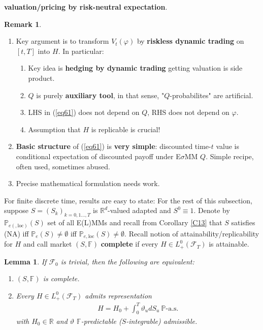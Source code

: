 \documentclass[12pt,a4paper, twoside]{article}
\newtheorem{lem}{Lemma}[section]
\theoremstyle{definition}
\newtheorem{rem}{Remark}[section]
\newcommand{\PP}{\mathbb{P}} %
\begin{document}
\textbf{valuation/pricing by risk-neutral expectation}. 
\newpage
\begin{rem} \
\begin{enumerate}
\item Key argument is to transform $V_t( \varphi)$ by \textbf{riskless dynamic trading} on $[t,T]$ into $H$. In particular:
\begin{enumerate}
\item Key idea is \textbf{hedging by dynamic trading} getting valuation is side product.
\item $Q$ is purely \textbf{auxiliary tool}, in that sense, "$Q$-probabilites" are artificial.
\item LHS in (\ref{eq61}) does not depend on $Q$, RHS does not depend on $\varphi$. 
\item Assumption that $H$ is replicable is crucial!
\end{enumerate}
\item \textbf{Basic structure} of (\ref{eq61}) is \textbf{very simple}: discounted time-$t$ value is conditional expectation of discounted payoff under E$\sigma$MM $Q$. Simple recipe, often used, sometimes abused.
\item Precise mathematical formulation needs work. 
\end{enumerate}
\end{rem}
For finite discrete time, results are easy to state: For the rest of this subsection, suppose $S=(S_k)_{k=0,1 \dots ,T}$ is $\mathbb{R}^d$-valued adapted and $S^0 \equiv 1$. Denote by $\PP_{e(, \text{loc})}(S)$ set of all E(L)MMs and recall from Corollary \ref{C13} that $S$ satisfies (NA) iff $\PP_e(S) \neq \emptyset$ iff $\PP_{e, \text{loc}}(S) \neq \emptyset$. Recall notion of attainability/replicability for $H$ and call market $(S, \mathbb{F})$ \textbf{complete} if every $H \in L_+^0( \mathcal{F}_T)$ is attainable. 
\begin{lem} \label{L61} If $\mathcal{F}_0$ is trivial, then the following are equivalent:
\begin{enumerate}
\item $(S, \mathbb{F})$ is complete.
\item Every $H \in L_+^0( \mathcal{F}_T)$ admits representation 
\begin{align*}
H= H_0 + \int_0^T \vartheta_u dS_u \ \PP\text{-a.s.}
\end{align*}
with $H_0 \in \mathbb{R}$ and $\vartheta$ $\mathbb{F}$-predictable ($S$-integrable) admissible. 
\end{enumerate}
\end{lem}
\end{document}
